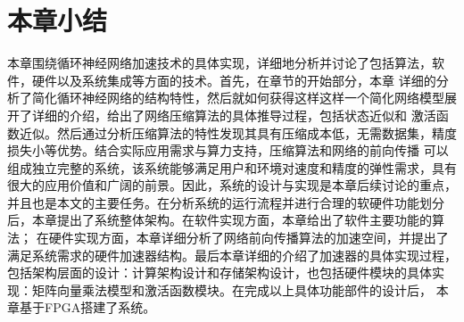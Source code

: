 \section{本章小结}
本章围绕循环神经网络加速技术的具体实现，详细地分析并讨论了包括算法，软件，硬件以及系统集成等方面的技术。首先，在章节的开始部分，本章
详细的分析了简化循环神经网络的结构特性，然后就如何获得这样这样一个简化网络模型展开了详细的介绍，给出了网络压缩算法的具体推导过程，包括状态近似和
激活函数近似。然后通过分析压缩算法的特性发现其具有压缩成本低，无需数据集，精度损失小等优势。结合实际应用需求与算力支持，压缩算法和网络的前向传播
可以组成独立完整的系统，该系统能够满足用户和环境对速度和精度的弹性需求，具有很大的应用价值和广阔的前景。因此，系统的设计与实现是本章后续讨论的重点，
并且也是本文的主要任务。在分析系统的运行流程并进行合理的软硬件功能划分后，本章提出了系统整体架构。在软件实现方面，本章给出了软件主要功能的算法；
在硬件实现方面，本章详细分析了网络前向传播算法的加速空间，并提出了满足系统需求的硬件加速器结构。最后本章详细的介绍了加速器的具体实现过程，
包括架构层面的设计：计算架构设计和存储架构设计，也包括硬件模块的具体实现：矩阵向量乘法模型和激活函数模块。在完成以上具体功能部件的设计后，
本章基于FPGA搭建了系统。
